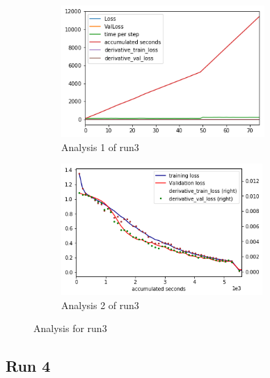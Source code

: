 \documentclass[paper=a4, fontsize=11pt]{scrartcl} %
\numberwithin{equation}{section} %
\numberwithin{figure}{section} %
\numberwithin{table}{section} %
\begin{document}
\begin{figure}	
	\begin{subfigure}{0.45\textwidth}
	\includegraphics[width=0.9\linewidth, height=5cm]{./imgs/analysis_0_3.png} 
	\caption{Analysis 1 of run3}
	\label{fig:subAnalysisRun3}
	\end{subfigure}
	\begin{subfigure}{0.45\textwidth}
	\includegraphics[width=0.9\linewidth, height=5cm]{./imgs/analysis_3plot.png}
	\caption{Analysis 2 of run3}
	\label{fig:subAnalysisRun3plot}
	\end{subfigure}
	 
	\caption{Analysis for run3}
	\label{fig:AnalysisRun3}
 \end{figure}

\subsection{Run 4}
\end{document}
